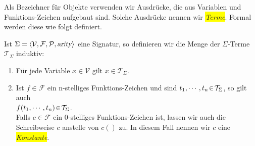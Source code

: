 \noindent
Als Bezeichner f\"{u}r Objekte verwenden wir Ausdr\"{u}cke, die aus Variablen und
Funktions-Zeichen aufgebaut sind.  Solche Ausdr\"{u}cke nennen wir \colorbox{yellow}{\emph{Terme}}.  
Formal werden diese wie folgt definiert.
\begin{Definition}
  Ist $\Sigma = \langle \mathcal{V}, \mathcal{F}, \mathcal{P}, \textsl{arity} \rangle$ eine Signatur, so definieren wir die Menge der $\Sigma$-Terme
  $\mathcal{T}_\Sigma$ induktiv:
  \begin{enumerate}
  \item F\"{u}r jede Variable $x \in \mathcal{V}$ gilt $x \in \mathcal{T}_\Sigma$.
  \item Ist $f \in \mathcal{F}$ ein n-stelliges Funktions-Zeichen und sind 
        $t_1,\cdots,t_n \!\in\! \mathcal{T}_\Sigma$, so gilt auch \\[0.2cm]
        \hspace*{1.3cm} $f(t_1,\cdots,t_n) \!\in\! \mathcal{T}_\Sigma$. \\[0.2cm]
        Falls $c \in \mathcal{F}$ ein 0-stelliges Funktions-Zeichen ist, lassen wir auch die Schreibweise
        $c$ anstelle von $c()$ zu.  In diesem Fall nennen wir $c$ eine \colorbox{yellow}{\emph{Konstante}}.
        \eox
  \end{enumerate}
\end{Definition}

